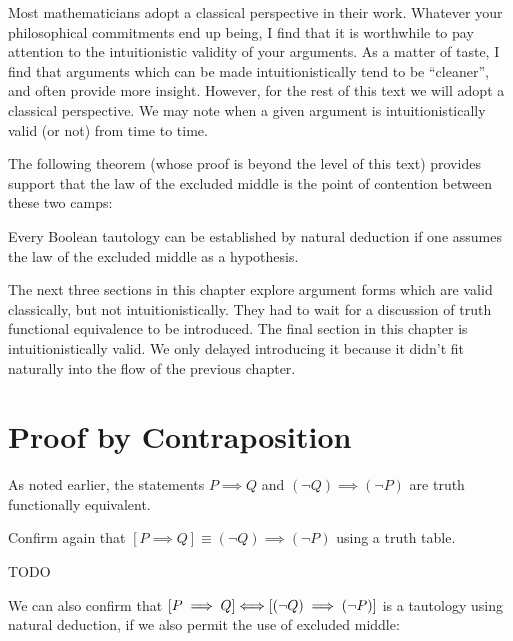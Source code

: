 Most mathematicians adopt a classical perspective in their work.  Whatever your philosophical commitments end up being, I find that it is worthwhile to pay attention to the intuitionistic validity of your arguments.  As a matter of taste, I find that arguments which can be made intuitionistically tend to be ``cleaner'', and often provide more insight.  However, for the rest of this text we will adopt a classical perspective.  We may note when a given argument is intuitionistically valid (or not) from time to time.

The following theorem (whose proof is beyond the level of this text) provides support that the law of the excluded middle is the point of contention between these two camps:

\begin{theorem}
		Every Boolean tautology can be established by natural deduction if one assumes the law of the excluded middle as a hypothesis.
\end{theorem}


The next three sections in this chapter explore argument forms which are valid classically, but not intuitionistically.  They had to wait for a discussion of truth functional equivalence to be introduced.  The final section in this chapter is intuitionistically valid.  We only delayed introducing it because it didn't fit naturally into the flow of the previous chapter.

\section{Proof by Contraposition}

As noted earlier, the statements $P \implies Q$ and $(\neg Q) \implies (\neg P)$ are truth functionally equivalent. 

\begin{xca}
		Confirm again that $ [ P \implies Q] \equiv (\neg Q) \implies (\neg P)$ using a truth table.
	\end{xca}

\begin{solutions}
	TODO
\end{solutions}

We can also confirm that $ [ P \implies Q] \Longleftrightarrow [(\neg Q) \implies (\neg P)]$ is a tautology using natural deduction, if we also permit the use of excluded middle:

